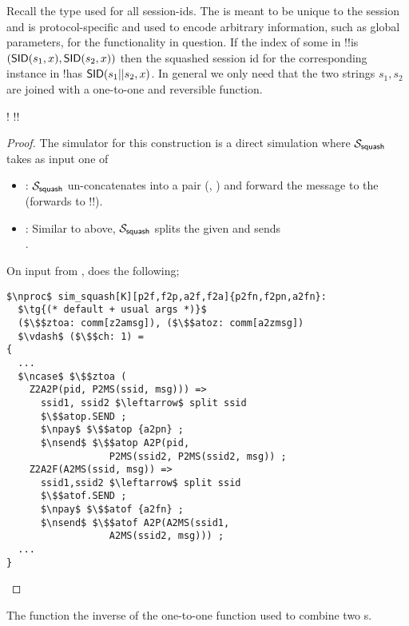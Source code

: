 Recall the type  used for all session-ids. The  is meant to be unique to the session and  is protocol-specific and used to encode arbitrary information, such as global parameters, for the functionality in question. 
If the index of some \F in !!\F is $({\mathsf {SID}}(s_1, x), {\mathsf {SID}}(s_2, x))$ then the squashed session id for the corresponding instance in !\F has ${\mathsf {SID}}(s_1 || s_2, x)$. 
In general we only need that the two strings $s_1, s_2$ are joined with a one-to-one and reversible function. 

\begin{theorem} \label{thm:squash}
	\begin{mathpar}
		{
			!\F {} !!\F
		}
	\end{mathpar}
\end{theorem}

\begin{proof}
The simulator for this construction is a direct simulation where $\mathcal{S}_{\mathsf{squash}}$ takes as input one of 
\begin{itemize}
	\item {}: $\mathcal{S}_{\mathsf{squash}}$ un-concatenates  into a pair (, ) and forward the message  to the \idealP (forwards to !!\F).
	\item {}: Similar to above, $\mathcal{S}_{\mathsf{squash}}$ splits the given  and sends \\ . 
\end{itemize}

On input from \Z,  does the following; 
\begin{lstlisting}[basicstyle=\footnotesize\BeraMonottFamily, frame=single, mathescape]
$\nproc$ sim_squash[K][p2f,f2p,a2f,f2a]{p2fn,f2pn,a2fn}:
  $\tg{(* default + usual args *)}$
  ($\$$ztoa: comm[z2amsg]), ($\$$atoz: comm[a2zmsg]) 
  $\vdash$ ($\$$ch: 1) =
{
  ...
  $\ncase$ $\$$ztoa (
    Z2A2P(pid, P2MS(ssid, msg))) =>
      ssid1, ssid2 $\leftarrow$ split ssid
      $\$$atop.SEND ;
      $\npay$ $\$$atop {a2pn} ;
      $\nsend$ $\$$atop A2P(pid, 
                  P2MS(ssid2, P2MS(ssid2, msg)) ;
    Z2A2F(A2MS(ssid, msg)) =>
      ssid1,ssid2 $\leftarrow$ split ssid
      $\$$atof.SEND ; 
      $\npay$ $\$$atof {a2fn} ;
      $\nsend$ $\$$atof A2P(A2MS(ssid1, 
                  A2MS(ssid2, msg))) ;
  ...
}	  
\end{lstlisting}
\end{proof}
The  function the inverse of the one-to-one function used to combine two s.

